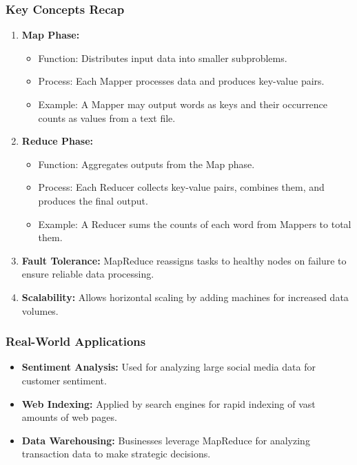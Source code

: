 \documentclass[aspectratio=169]{beamer}
\begin{document}
\begin{frame}[fragile]
    \frametitle{Key Concepts Recap}
    \begin{enumerate}
        \item \textbf{Map Phase:}
        \begin{itemize}
            \item Function: Distributes input data into smaller subproblems.
            \item Process: Each Mapper processes data and produces key-value pairs.
            \item Example: A Mapper may output words as keys and their occurrence counts as values from a text file.
        \end{itemize}
        
        \item \textbf{Reduce Phase:}
        \begin{itemize}
            \item Function: Aggregates outputs from the Map phase.
            \item Process: Each Reducer collects key-value pairs, combines them, and produces the final output.
            \item Example: A Reducer sums the counts of each word from Mappers to total them.
        \end{itemize}
    
        \item \textbf{Fault Tolerance:} 
        MapReduce reassigns tasks to healthy nodes on failure to ensure reliable data processing.
        
        \item \textbf{Scalability:} 
        Allows horizontal scaling by adding machines for increased data volumes.
    \end{enumerate}
\end{frame}

\begin{frame}[fragile]
    \frametitle{Real-World Applications}
    \begin{itemize}
        \item \textbf{Sentiment Analysis:} Used for analyzing large social media data for customer sentiment.
        \item \textbf{Web Indexing:} Applied by search engines for rapid indexing of vast amounts of web pages.
        \item \textbf{Data Warehousing:} Businesses leverage MapReduce for analyzing transaction data to make strategic decisions.
    \end{itemize}
\end{frame}
\end{document}
